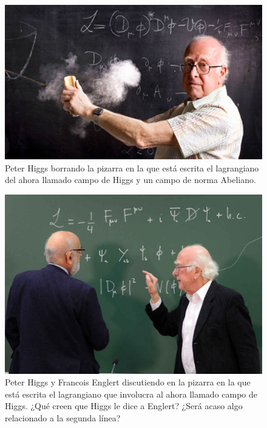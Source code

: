 \documentclass[12pt,a4paper]{report}
\author{Jos\'e Antonio Garc\'ia-Hern\'andez}
\begin{document}
\begin{figure}
\includegraphics[scale=0.5]{images/Peter_Higgs.jpg}
\caption{Peter Higgs borrando la pizarra en la que est\'a escrita el lagrangiano del ahora llamado campo de Higgs y un campo de norma Abeliano.}
\end{figure}


\begin{figure}
\includegraphics[scale=0.5]{images/higgs_englert_pizarra.jpeg}
\caption{Peter Higgs y Francois Englert discutiendo en la pizarra en la que est\'a escrita el lagrangiano que involucra al ahora llamado campo de Higgs. ¿Qu\'e creen que Higgs le dice a Englert? ¿Ser\'a acaso algo relacionado a la segunda l\'inea?}
\end{figure}
\end{document}
